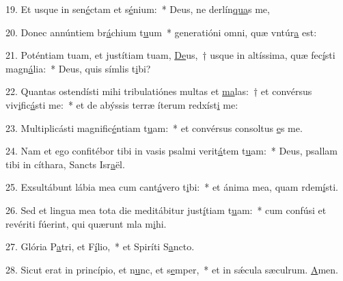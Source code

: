 19. Et usque in sen\uline{é}ctam et s\uline{é}nium:~* Deus, ne derlín\uline{qua}s me,\par 
20. Donec annúntiem br\uline{á}chium t\uline{u}um~* generatióni omni, quæ vntúr\uline{a} est:\par 
21. Poténtiam tuam, et justítiam tuam, \uline{De}us,~† usque in altíssima, quæ fec\uline{í}sti magn\uline{á}lia:~* Deus, quis símlis t\uline{i}bi?\par 
22. Quantas ostendísti mihi tribulatiónes multas et \uline{ma}las:~† et convérsus viv\uline{i}fic\uline{á}sti me:~* et de abýssis terræ íterum redxíst\uline{i} me:\par 
23. Multiplicásti magnific\uline{é}ntiam t\uline{u}am:~* et convérsus consoltus \uline{e}s me.\par 
24. Nam et ego confitébor tibi in vasis psalmi verit\uline{á}tem t\uline{u}am:~* Deus, psallam tibi in cíthara, Sancts Isr\uline{a}ël.\par 
25. Exsultábunt lábia mea cum cant\uline{á}vero t\uline{i}bi:~* et ánima mea, quam rdem\uline{í}sti.\par 
26. Sed et lingua mea tota die meditábitur just\uline{í}tiam t\uline{u}am:~* cum confúsi et revériti fúerint, qui quærunt mla m\uline{i}hi.\par 
27. Glória P\uline{a}tri, et F\uline{í}lio,~* et Spiríti S\uline{a}ncto.\par 
28. Sicut erat in princípio, et n\uline{u}nc, et s\uline{e}mper,~* et in sǽcula sæculrum. \uline{A}men.\par 
